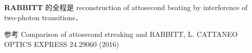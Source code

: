 
\textbf{RABBITT} 的全程是 reconstruction of attosecond beating by interference of two-photon transitions．

参考 Comparison of attosecond streaking and RABBITT, L. CATTANEO OPTICS EXPRESS 24.29060 (2016)

